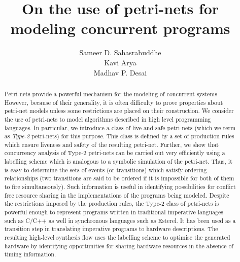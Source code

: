 \documentclass[12pt,a4paper]{article}
\title{On the use of petri-nets for modeling concurrent programs}
\author{Sameer D. Sahasrabuddhe \\ Kavi Arya \\ Madhav P. Desai}
\date{}
\begin{document}
\maketitle

\begin{abstract}
  \large

  Petri-nets provide a powerful mechanism for the modeling of
  concurrent systems.   However, because of their generality, 
  it is often difficulty to prove properties about petri-net
  models unless some restrictions are placed on their construction.
  We consider the use of petri-nets to model algorithms described
  in high level programming languages.  In particular, we introduce
  a class of live and safe petri-nets (which we term as {\em Type-2}
  petri-nets) for this purpose.   This class is defined by a
  set of production rules which ensure liveness and safety of
  the resulting petri-net.  
  Further, we show that concurrency
  analysis of Type-2 petri-nets can be carried out very efficiently
  using a labelling scheme which is analogous to a symbolic simulation
  of the petri-net.
  Thus, it is easy to determine the sets of events (or transitions)
  which satisfy ordering relationships (two transitions are said to
  be ordered if it is impossible for both of them to fire simultaneously).  
  Such information is useful in identifying possibilities for conflict 
  free resource sharing in the implementations of the programs being
  modeled.
  Despite the restrictions imposed by the production rules, the Type-2
  class of petri-nets is powerful enough to represent programs
  written in traditional imperative languages such as C/C++ as well in synchronous
  languages such as Esterel. It has been used as a transition step in translating
  imperative programs to hardware descriptions\cite{ahir-thesis}. The
  resulting high-level synthesis flow uses the labelling scheme to
  optimise the generated hardware by identifying opportunities for
  sharing hardware resources in the absence of timing information.

\end{abstract}
\end{document}
